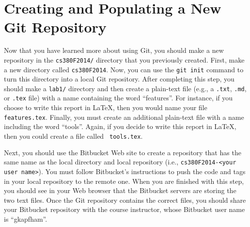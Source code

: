 
\section*{Creating and Populating a New Git Repository}

Now that you have learned more about using Git, you should make a new repository in the {\tt cs380F2014/} directory that
you previously created.  First, make a new directory called {\tt cs380F2014}. Now, you can use the
{\tt git init} command to turn this directory into a local Git repository.  After completing this step, you should
make a {\tt lab1/} directory and then create a plain-text file (e.g., a {\tt .txt}, {\tt .md}, or {\tt .tex} file) with
a name containing the word ``features''.  For instance, if you choose to write this report in \LaTeX, then you would
name your file {\tt features.tex}. Finally, you must create an additional plain-text file with a name including the word
``tools''.  Again, if you decide to write this report in \LaTeX, then you could create a file called {\tt
  tools.tex}. 

Next, you should use the Bitbucket Web site to create a repository that has the same name as the local directory and
local repository (i.e., {\tt cs380F2014-<your user name>}).  You must follow Bitbucket's instructions to push the code
and tags in your local repository to the remote one. When you are finished with this step, you should see in your Web
browser that the Bitbucket servers are storing the two text files. Once the Git repository contains the correct files,
you should share your Bitbucket repository with the course instructor, whose Bitbucket user name is ``gkapfham''.


